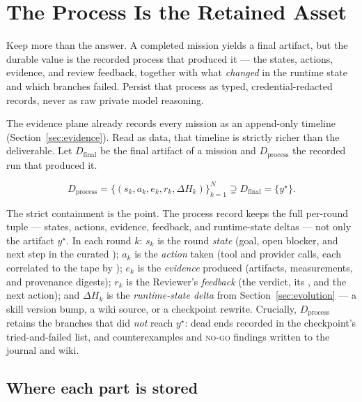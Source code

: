 \section{The Process Is the Retained Asset}
\label{sec:process}\label{sec:processdata}

\begin{designbox}
Keep more than the answer. A completed mission yields a final artifact, but the
durable value is the recorded process that produced it --- the states, actions,
evidence, and review feedback, together with what \emph{changed} in the runtime state
and which branches failed. Persist that process as typed, credential-redacted
records, never as raw private model reasoning.
\end{designbox}

The evidence plane already records every mission as an append-only timeline
(Section~\ref{sec:evidence}). Read as data, that timeline is strictly richer than the
deliverable. Let $D_{\mathrm{final}}$ be the final artifact of a mission and
$D_{\mathrm{process}}$ the recorded run that produced it.

\begin{equation}
D_{\mathrm{process}}
= \{(s_k,a_k,e_k,r_k,\Delta H_k)\}_{k=1}^{N}
\supsetneq
D_{\mathrm{final}}=\{y^\star\}.
\end{equation}

The strict containment is the point. The process record keeps the full per-round
tuple --- states, actions, evidence, feedback, and runtime-state deltas --- not only
the artifact $y^\star$. In each round $k$: $s_k$ is the round \emph{state} (goal,
open blocker, and next step in the curated ); $a_k$ is the
\emph{action} taken (tool and provider calls, each correlated to the tape by
); $e_k$ is the \emph{evidence} produced (artifacts, measurements, and
provenance digests); $r_k$ is the Reviewer's \emph{feedback} (the verdict, its
, and the next action); and $\Delta H_k$ is the
\emph{runtime-state delta} from Section~\ref{sec:evolution} --- a skill version bump,
a wiki source, or a checkpoint rewrite. Crucially, $D_{\mathrm{process}}$ retains the
branches that did \emph{not} reach $y^\star$: dead ends recorded in the checkpoint's
tried-and-failed list, and counterexamples and \textsc{no-go} findings written to the
journal and wiki.

\subsection{Where each part is stored}


